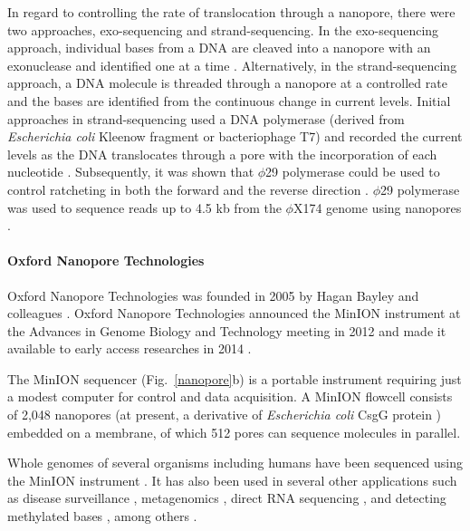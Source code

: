 In regard to controlling the rate of translocation through a nanopore,
there were two approaches, exo-sequencing and strand-sequencing.
In the exo-sequencing approach, individual bases from a DNA are cleaved
into a nanopore with an exonuclease and identified one at a time
\citep{astier2006toward,clarke2009continuous}.
Alternatively, in the strand-sequencing approach, a DNA molecule is
threaded through a nanopore at a controlled rate and the bases are
identified from the continuous change in current levels. Initial
approaches in strand-sequencing used a DNA polymerase (derived from
\emph{Escherichia coli} Kleenow fragment or bacteriophage T7) and
recorded the current levels as the DNA translocates through a pore with
the incorporation of each nucleotide
\citep{benner2007sequence,cockroft2008single,gyarfas2009mapping,
chu2010real}.
%
Subsequently, it was shown that $\phi$29 polymerase could be used to
control ratcheting in both the forward and the reverse direction
\citep{lieberman2010processive,manrao2012reading,cherf2012automated}.
$\phi$29 polymerase was used to sequence reads up to 4.5 kb from the
$\phi$X174 genome using nanopores \citep{laszlo2014decoding}.


\paragraph{Oxford Nanopore Technologies}
Oxford Nanopore Technologies was founded in 2005 by Hagan Bayley and
colleagues \citep{deamer2016three}. Oxford Nanopore Technologies
announced the MinION instrument at the Advances in Genome Biology and
Technology meeting in 2012 and made it available to early access
researches in 2014 \citep{deamer2016three,bayley2015nanopore}.

The MinION sequencer (Fig.~\ref{nanopore}b) is a portable instrument
requiring just a modest computer for control and data acquisition.  A
MinION flowcell consists of 2,048 nanopores (at present, a derivative of
\emph{Escherichia coli} CsgG protein \citep{brown2016nanopore}) embedded
on a membrane, of which 512 pores can sequence molecules in parallel.

Whole genomes of several organisms including humans have been sequenced
using the MinION instrument \citep{loman2015complete,stancu2017mapping,
jain2018nanopore,bowden2019sequencing,moss2020complete}. It has also
been used in several other applications such as disease surveillance
\citep{quick2016real,faria2016mobile}, metagenomics
\citep{goordial2017situ,charalampous2019nanopore,leggett2020rapid},
direct RNA sequencing \citep{garalde2018highly,workman2019nanopore,
depledge2019direct}, and detecting methylated bases
\citep{rand2017mapping,simpson2017detecting,liu2019accurate}, among
others \citep{jain2016oxford}.

